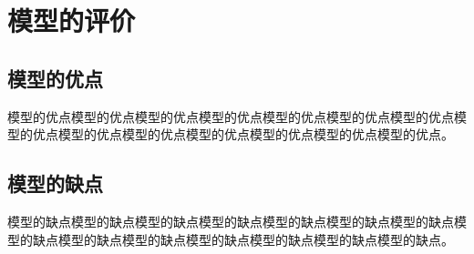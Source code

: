 \section{模型的评价}
\subsection{模型的优点}
模型的优点模型的优点模型的优点模型的优点模型的优点模型的优点模型的优点模型的优点模型的优点模型的优点模型的优点模型的优点模型的优点模型的优点。
\subsection{模型的缺点}
模型的缺点模型的缺点模型的缺点模型的缺点模型的缺点模型的缺点模型的缺点模型的缺点模型的缺点模型的缺点模型的缺点模型的缺点模型的缺点模型的缺点。
